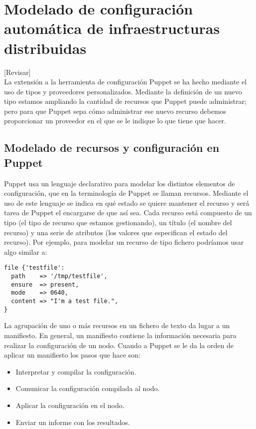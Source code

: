 \chapter{Modelado de configuración automática de infraestructuras distribuidas}
\label{cap:modelado}

[Revisar]\\

La extensión a la herramienta de configuración Puppet se ha hecho mediante el uso de tipos y proveedores personalizados. Mediante la definición de un nuevo tipo estamos ampliando la cantidad de recursos que Puppet puede administrar; pero para que Puppet sepa cómo administrar ese nuevo recurso debemos proporcionar un proveedor en el que se le indique lo que tiene que hacer.


\section{Modelado de recursos y configuración en Puppet}

Puppet usa un lenguaje declarativo para modelar los distintos elementos de configuración, que en la terminología de Puppet se llaman recursos. Mediante el uso de este lenguaje se indica en qué estado se quiere mantener el recurso y será tarea de Puppet el encargarse de que así sea. Cada recurso está compuesto de un tipo (el tipo de recurso que estamos gestionando), un título (el nombre del recurso) y una serie de atributos (los valores que especifican el estado del recurso). Por ejemplo, para modelar un recurso de tipo fichero podríamos usar algo similar a:

\begin{lstlisting}
file {'testfile':
  path    => '/tmp/testfile',
  ensure  => present,
  mode    => 0640,
  content => "I'm a test file.",
}
\end{lstlisting}

La agrupación de uno o más recursos en un fichero de texto da lugar a un manifiesto. En general, un manifiesto contiene la información necesaria para realizar la configuración de un nodo. Cuando a Puppet se le da la orden de aplicar un manifiesto los pasos que hace son:
\begin{itemize}
\item Interpretar y compilar la configuración.
\item Comunicar la configuración compilada al nodo.
\item Aplicar la configuración en el nodo.
\item Enviar un informe con los resultados.
\end{itemize}



